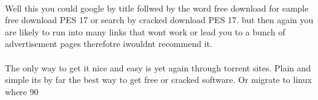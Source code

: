 \documentclass[11pt]{article}
\begin{document}
	\paragraph{}
	Well this you could google by title follwed by the word free download for eample free download PES 17 or search by cracked download PES 17.
	but then again you are likely to run into many links that wont work or lead you to a bunch of advertisement pages therefotre  iwouldnt recommend it.
	\paragraph{}
	The only way to get it nice and easy is yet again through torrent sites.
	Plain and simple its by far the best way to get free or cracked software.
	Or migrate to linux where 90%
	
	
	\newpage
\end{document}
